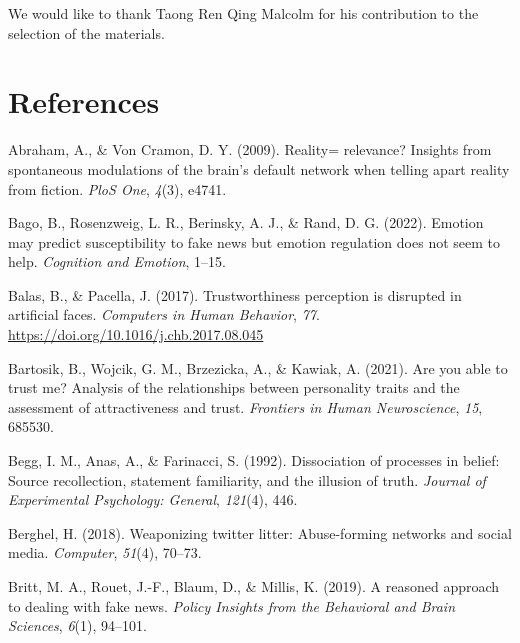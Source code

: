 \documentclass[
  man,floatsintext]{apa6}
\newlength{\cslhangindent}
\newlength{\cslentryspacingunit} %
\newenvironment{CSLReferences}[2] %
 {%
  \setlength{\parindent}{0pt}
  \ifodd #1
  \let\oldpar\par
  \def\par{\hangindent=\cslhangindent\oldpar}
  \fi
  \setlength{\parskip}{#2\cslentryspacingunit}
 }%
 {}
\begin{document}
We would like to thank Taong Ren Qing Malcolm for his contribution to the selection of the materials.

\newpage

\hypertarget{references}{%
\section{References}\label{references}}

\hypertarget{refs}{}
\begin{CSLReferences}{1}{0}
\leavevmode{}%
Abraham, A., \& Von Cramon, D. Y. (2009). Reality= relevance? Insights from spontaneous modulations of the brain's default network when telling apart reality from fiction. \emph{PloS One}, \emph{4}(3), e4741.

\leavevmode{}%
Bago, B., Rosenzweig, L. R., Berinsky, A. J., \& Rand, D. G. (2022). Emotion may predict susceptibility to fake news but emotion regulation does not seem to help. \emph{Cognition and Emotion}, 1--15.

\leavevmode{}%
Balas, B., \& Pacella, J. (2017). Trustworthiness perception is disrupted in artificial faces. \emph{Computers in Human Behavior}, \emph{77}. \url{https://doi.org/10.1016/j.chb.2017.08.045}

\leavevmode{}%
Bartosik, B., Wojcik, G. M., Brzezicka, A., \& Kawiak, A. (2021). Are you able to trust me? Analysis of the relationships between personality traits and the assessment of attractiveness and trust. \emph{Frontiers in Human Neuroscience}, \emph{15}, 685530.

\leavevmode{}%
Begg, I. M., Anas, A., \& Farinacci, S. (1992). Dissociation of processes in belief: Source recollection, statement familiarity, and the illusion of truth. \emph{Journal of Experimental Psychology: General}, \emph{121}(4), 446.

\leavevmode{}%
Berghel, H. (2018). Weaponizing twitter litter: Abuse-forming networks and social media. \emph{Computer}, \emph{51}(4), 70--73.

\leavevmode{}%
Britt, M. A., Rouet, J.-F., Blaum, D., \& Millis, K. (2019). A reasoned approach to dealing with fake news. \emph{Policy Insights from the Behavioral and Brain Sciences}, \emph{6}(1), 94--101.


\end{CSLReferences}
\end{document}
